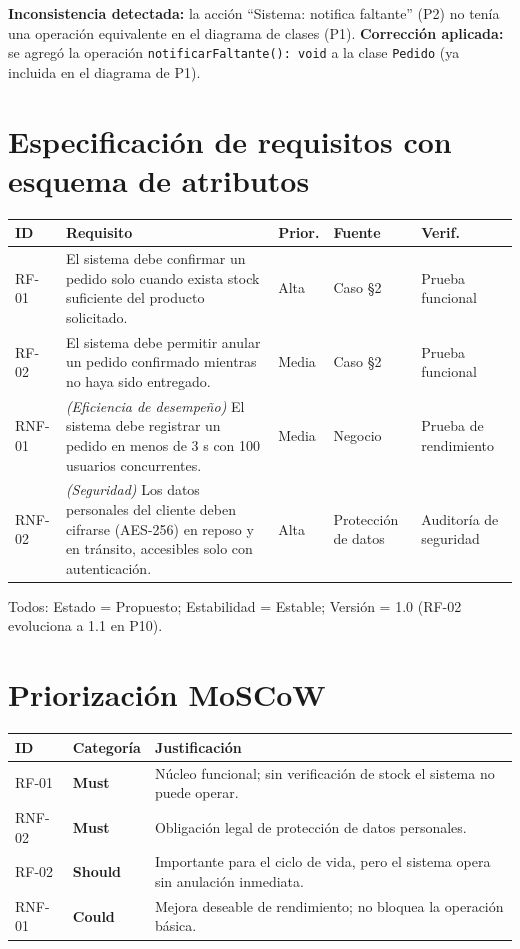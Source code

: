 \documentclass[11pt]{article}
\begin{document}
\textbf{Inconsistencia detectada:} la acción ``Sistema: notifica faltante'' (P2) no tenía una operación equivalente en el diagrama de clases (P1).
\textbf{Corrección aplicada:} se agregó la operación \texttt{notificarFaltante(): void} a la clase \texttt{Pedido} (ya incluida en el diagrama de P1).

\section{Especificación de requisitos con esquema de atributos}

\begin{center}
\small
\begin{tabular}{p{1.3cm}p{6.3cm}p{1.2cm}p{1.4cm}p{1.6cm}}
\toprule
\textbf{ID} & \textbf{Requisito} & \textbf{Prior.} & \textbf{Fuente} & \textbf{Verif.} \\
\midrule
RF-01 & El sistema debe confirmar un pedido solo cuando exista stock suficiente del producto solicitado. & Alta & Caso §2 & Prueba funcional \\
RF-02 & El sistema debe permitir anular un pedido confirmado mientras no haya sido entregado. & Media & Caso §2 & Prueba funcional \\
RNF-01 & \emph{(Eficiencia de desempeño)} El sistema debe registrar un pedido en menos de 3 s con 100 usuarios concurrentes. & Media & Negocio & Prueba de rendimiento \\
RNF-02 & \emph{(Seguridad)} Los datos personales del cliente deben cifrarse (AES-256) en reposo y en tránsito, accesibles solo con autenticación. & Alta & Protección de datos & Auditoría de seguridad \\
\bottomrule
\end{tabular}
\end{center}
Todos: Estado = Propuesto; Estabilidad = Estable; Versión = 1.0 (RF-02 evoluciona a 1.1 en P10).

\section{Priorización MoSCoW}

\begin{center}
\small
\begin{tabular}{p{1.3cm}p{1.6cm}p{9.5cm}}
\toprule
\textbf{ID} & \textbf{Categoría} & \textbf{Justificación} \\
\midrule
RF-01 & \textbf{Must} & Núcleo funcional; sin verificación de stock el sistema no puede operar. \\
RNF-02 & \textbf{Must} & Obligación legal de protección de datos personales. \\
RF-02 & \textbf{Should} & Importante para el ciclo de vida, pero el sistema opera sin anulación inmediata. \\
RNF-01 & \textbf{Could} & Mejora deseable de rendimiento; no bloquea la operación básica. \\
\bottomrule
\end{tabular}
\end{center}
\end{document}
